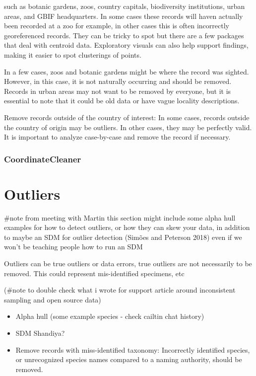 \documentclass[
  letterpaper,
  DIV=11,
  numbers=noendperiod,
  oneside]{scrreprt}
\begin{document}
such as botanic gardens, zoos, country capitals, biodiversity
institutions, urban areas, and GBIF headquarters. In some cases these
records will haven actually been recorded at a zoo for example, in other
cases this is often incorrectly georeferenced records. They can be
tricky to spot but there are a few packages that deal with centroid
data. Exploratory visuals can also help support findings, making it
easier to spot clusterings of points.

In a few cases, zoos and botanic gardens might be where the record was
sighted. However, in this case, it is not naturally occurring and should
be removed. Records in urban areas may not want to be removed by
everyone, but it is essential to note that it could be old data or have
vague locality descriptions.

Remove records outside of the country of interest: In some cases,
records outside the country of origin may be outliers. In other cases,
they may be perfectly valid. It is important to analyze case-by-case and
remove the record if necessary.

\hypertarget{coordinatecleaner}{%
\subsection{CoordinateCleaner}\label{coordinatecleaner}}


\hypertarget{outliers}{%
\chapter{Outliers}\label{outliers}}

\#note from meeting with Martin this section might include some alpha
hull examples for how to detect outliers, or how they can skew your
data, in addition to maybe an SDM for outlier detection (Simões and
Peterson 2018) even if we won't be teaching people how to run an SDM

Outliers can be true outliers or data errors, true outliers are not
necessarily to be removed. This could represent mis-identified
specimens, etc

(\#note to double check what i wrote for support article around
inconsistent sampling and open source data)

\begin{itemize}
\item
  Alpha hull (some example species - check cailtin chat history)
\item
  SDM Shandiya?
\item
  Remove records with miss-identified taxonomy: Incorrectly identified
  species, or unrecognized species names compared to a naming authority,
  should be removed.
\end{itemize}
\end{document}
